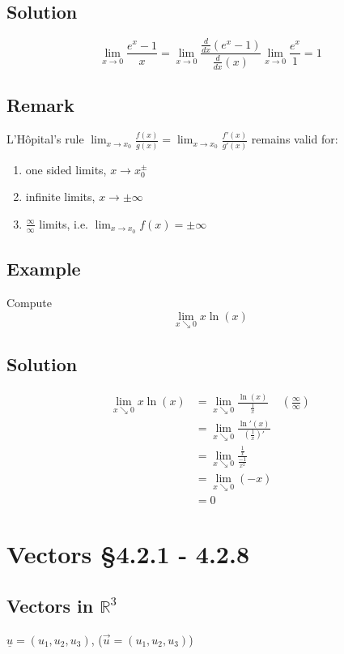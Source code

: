 \documentclass[11pt]{article}
\newcommand{\reals}{\mathbb{R}}
\begin{document}
\subsection{Solution}
\[ \lim_{x\rightarrow 0 } \frac{e^x-1}{x} = \lim_{x\rightarrow 0 } \frac{\frac{d}{dx} \left( e^x-1 \right)}{\frac{d}{dx}(x)} \lim_{x\rightarrow 0 } \frac{e^x}{1} = 1 \]

\subsection{Remark}
L'Hôpital's rule $\displaystyle{\lim_{x\rightarrow x_0 } \frac{f(x)}{g(x)} = \lim_{x\rightarrow x_0 } \frac{f'(x)}{g'(x)}}$ remains valid for:
\begin{enumerate}[ (i) ]
\item one sided limits, $x \rightarrow x_0^\pm$
\item infinite limits, $x \rightarrow \pm \infty$
\item $\displaystyle{\frac{\infty}{\infty}}$ limits, i.e. $\displaystyle{\lim_{x \rightarrow x_0}} f(x) = \pm \infty$
\end{enumerate}

\subsection{Example}
Compute
\[ \lim_{x \searrow 0} x \ln(x) \]

\subsection{Solution}
\begin{align*}
\lim_{x \searrow 0} x \ln(x) &= \lim_{x \searrow 0} \frac{\ln(x)}{\frac{1}{x}} & (\frac{\infty}{\infty}) \\
&= \lim_{x \searrow 0} \frac{\ln'(x)}{(\frac{1}{x})'} \\
&= \lim_{x \searrow 0} \frac{\frac{1}{x}}{\frac{-1}{x^2}} \\
&= \lim_{x \searrow 0} (-x) \\
&= 0
\end{align*}

\section{Vectors §4.2.1 - 4.2.8}
\subsection[Vectors in R3]{Vectors in $\reals^3$}
$\underline{u} = (u_1, u_2, u_3)$, ($\vec{u} = (u_1, u_2, u_3)$)
\end{document}
